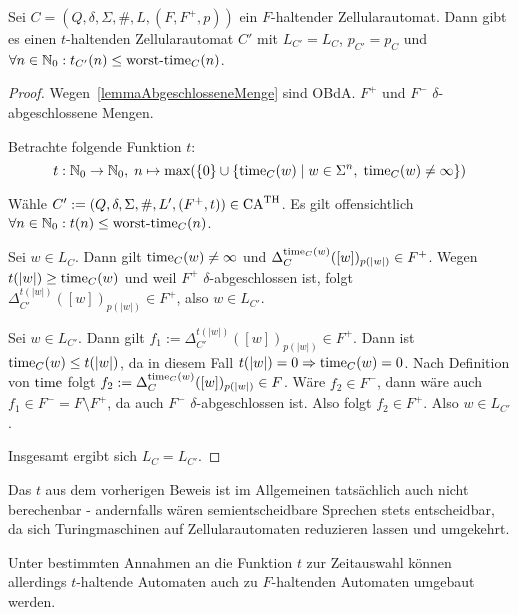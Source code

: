 \begin{satz}
    Sei $C = (Q, \delta, \Sigma, \#, L, (F, F^+, p))$ ein $F$-haltender Zellularautomat.
    Dann gibt es einen $t$-haltenden Zellularautomat $C'$ mit $L_{C'} = L_C$, $p_{C'} = p_C$ und $\forall n \in \mathbb{N}_0: t_{C'}(n) \leq \operatorname{worst-time}_C(n)$.
\end{satz}
\begin{proof}
    Wegen~\cref{lemmaAbgeschlosseneMenge} sind \acs{OBdA.} $F^+$ und $F^-$ $\delta$-abgeschlossene Mengen.
    
    Betrachte folgende Funktion $t$:
    \[
        t: \mathbb{N}_0 \to \mathbb{N}_0, \; n \mapsto \max(\{ { 0 } \} \cup \{ { \operatorname{time}_C(w) } \; | \; { w \in \Sigma^n, \; \operatorname{time}_C(w) \neq \infty } \})
    \]

    Wähle $C' := (Q, \delta, \Sigma, \#, L', (F^+, t)) \in \textrm{CA}^{\textrm{TH}}$.
    Es gilt offensichtlich $\forall n \in \mathbb{N}_0: t(n) \leq \operatorname{worst-time}_C(n)$.
    
    Sei $w \in L_C$. Dann gilt $\operatorname{time}_C(w) \neq \infty$ und $\Delta_{C}^{\operatorname{time}_C(w)}([w])_{p(|w|)} \in F^+$.
    Wegen $t(|w|) \geq \operatorname{time}_C(w)$ und weil $F^+$ $\delta$-abgeschlossen ist, folgt $\Delta_{C'}^{t(|w|)}([w])_{p(|w|)} \in F^+$,
    also $w \in L_{C'}$.
    
    Sei $w \in L_{C'}$. Dann gilt $f_1 := \Delta_{C'}^{t(|w|)}([w])_{p(|w|)} \in F^+$.
    Dann ist $\operatorname{time}_C(w) \leq t(|w|)$, da in diesem Fall $t(|w|) = 0 \Rightarrow \operatorname{time}_C(w) = 0$.
    Nach Definition von $\operatorname{time}$ folgt $f_2 := \Delta_{C}^{\operatorname{time}_C(w)}([w])_{p(|w|)} \in F$.
    Wäre $f_2 \in F^-$, dann wäre auch $f_1 \in F^- = F \setminus F^+$, da auch $F^-$ $\delta$-abgeschlossen ist.
    Also folgt $f_2 \in F^+$. Also $w \in L_{C'}$.
    
    Insgesamt ergibt sich $L_C = L_{C'}$.
\end{proof}

\begin{remark}
    Das $t$ aus dem vorherigen Beweis ist im Allgemeinen tatsächlich auch nicht berechenbar - andernfalls
    wären semientscheidbare Sprechen stets entscheidbar, da sich Turingmaschinen auf Zellularautomaten reduzieren lassen und umgekehrt.
\end{remark}

Unter bestimmten Annahmen an die Funktion $t$ zur Zeitauswahl können allerdings $t$-haltende Automaten auch zu $F$-haltenden Automaten umgebaut werden.

